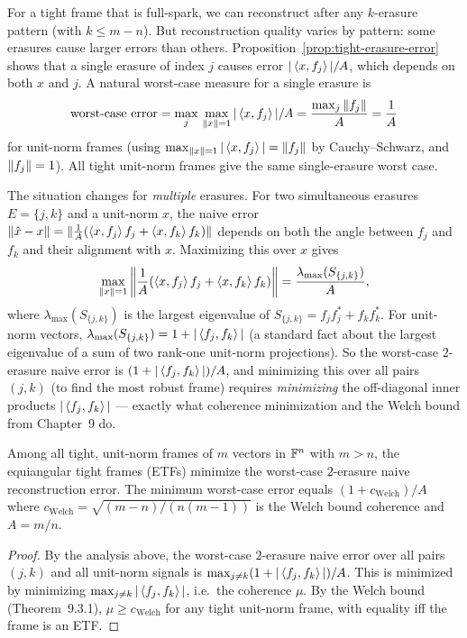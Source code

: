 For a tight frame that is full-spark, we can reconstruct after any
$k$-erasure pattern (with $k\le m-n$). But reconstruction quality varies
by pattern: some erasures cause larger errors than others.
Proposition~\ref{prop:tight-erasure-error} shows that a single erasure of
index $j$ causes error $|\left\langle x, f_j \right\rangle|/A$, which depends on both $x$
and $j$. A natural worst-case measure for a single erasure is
\[
  \text{worst-case error} = \max_j\,\max_{\left\| x \right\|=1}|\left\langle x, f_j \right\rangle|/A
  = \frac{\max_j \left\| f_j \right\|}{A} = \frac{1}{A}
\]
for unit-norm frames (using $\max_{\left\| x \right\|=1}|\left\langle x, f_j \right\rangle|=\left\| f_j \right\|$
by Cauchy--Schwarz, and $\left\| f_j \right\|=1$). All tight unit-norm frames give
the same single-erasure worst case.

The situation changes for \emph{multiple} erasures. For two simultaneous
erasures $E=\{j,k\}$ and a unit-norm $x$, the naive error
$\|\hat x-x\|=\|\tfrac{1}{A}(\left\langle x, f_j \right\rangle f_j+\left\langle x, f_k \right\rangle f_k)\|$
depends on both the angle between $f_j$ and $f_k$ and their alignment
with $x$. Maximizing this over $x$ gives
\[
  \max_{\left\| x \right\|=1}\left\|\frac{1}{A}(\left\langle x, f_j \right\rangle f_j+\left\langle x, f_k \right\rangle f_k)\right\|
  = \frac{\lambda_{\max}(S_{\{j,k\}})}{A},
\]
where $\lambda_{\max}(S_{\{j,k\}})$ is the largest eigenvalue of
$S_{\{j,k\}}=f_jf_j^*+f_kf_k^*$. For unit-norm vectors,
$\lambda_{\max}(S_{\{j,k\}})=1+|\left\langle f_j, f_k \right\rangle|$ (a standard fact
about the largest eigenvalue of a sum of two rank-one unit-norm
projections). So the worst-case $2$-erasure naive error is
$(1+|\left\langle f_j, f_k \right\rangle|)/A$, and minimizing this over all pairs $(j,k)$
(to find the most robust frame) requires \emph{minimizing} the
off-diagonal inner products $|\left\langle f_j, f_k \right\rangle|$ --- exactly what
coherence minimization and the Welch bound from Chapter~9 do.

\begin{theorem}
\label{thm:etf-erasure-optimal}
Among all tight, unit-norm frames of $m$ vectors in $\mathbb{F}^n$ with $m>n$,
the equiangular tight frames (ETFs) minimize the worst-case
$2$-erasure naive reconstruction error. The minimum worst-case error
equals $(1+c_{\mathrm{Welch}})/A$ where $c_{\mathrm{Welch}} =
\sqrt{(m-n)/(n(m-1))}$ is the Welch bound coherence and $A=m/n$.
\end{theorem}

\begin{proof}
By the analysis above, the worst-case $2$-erasure naive error over all
pairs $(j,k)$ and all unit-norm signals is
$\max_{j\ne k}(1+|\left\langle f_j, f_k \right\rangle|)/A$. This is minimized by
minimizing $\max_{j\ne k}|\left\langle f_j, f_k \right\rangle|$, i.e.\ the coherence
$\mu$. By the Welch bound (Theorem~9.3.1), $\mu\ge c_{\mathrm{Welch}}$
for any tight unit-norm frame, with equality iff the frame is an ETF.
\end{proof}

